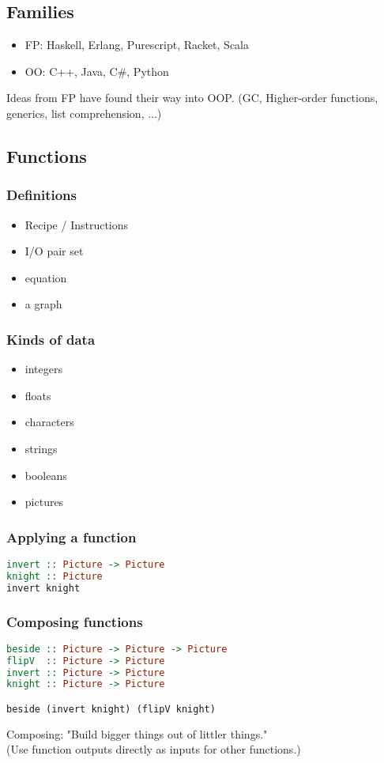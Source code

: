 \documentclass{article}
\begin{document}
\subsection{Families}
\begin{itemize}
    \item FP: Haskell, Erlang, Purescript, Racket, Scala
    \item OO: C++, Java, C\#, Python
\end{itemize}
Ideas from FP have found their way into OOP. (GC, Higher-order functions, generics, list comprehension, ...)
\subsection{Functions}
\subsubsection{Definitions}
\begin{itemize}
    \item Recipe / Instructions
    \item I/O pair set
    \item equation
    \item a graph
\end{itemize}
\subsubsection{Kinds of data}
\begin{itemize}
    \item integers
    \item floats
    \item characters
    \item strings
    \item booleans
    \item pictures
\end{itemize}
\subsubsection{Applying a function}
\begin{lstlisting}[language=haskell]
invert :: Picture -> Picture
knight :: Picture
invert knight
\end{lstlisting}
\subsubsection{Composing functions}
\begin{lstlisting}[language=haskell]
beside :: Picture -> Picture -> Picture
flipV  :: Picture -> Picture
invert :: Picture -> Picture
knight :: Picture -> Picture

beside (invert knight) (flipV knight)
\end{lstlisting}
Composing: "Build bigger things out of littler things."\\
(Use function outputs directly as inputs for other functions.)
\end{document}
